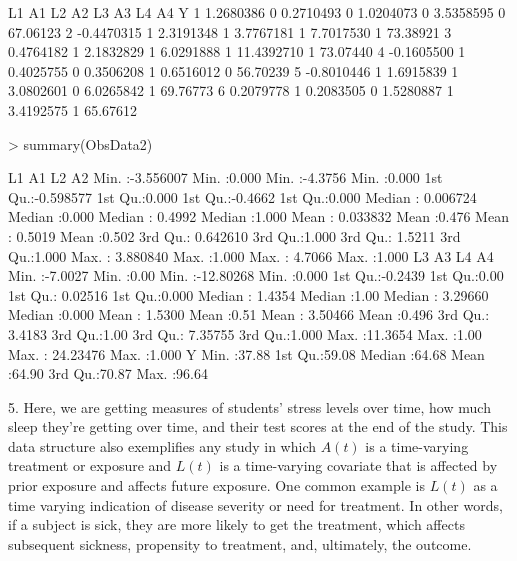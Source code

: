 \documentclass[answers]{exam}
\begin{document}
\begin{solution}
\begin{Schunk}
\begin{Soutput}
          L1 A1        L2 A2        L3 A3         L4 A4        Y
1  1.2680386  0 0.2710493  0 1.0204073  0  3.5358595  0 67.06123
2 -0.4470315  1 2.3191348  1 3.7767181  1  7.7017530  1 73.38921
3  0.4764182  1 2.1832829  1 6.0291888  1 11.4392710  1 73.07440
4 -0.1605500  1 0.4025755  0 0.3506208  1  0.6516012  0 56.70239
5 -0.8010446  1 1.6915839  1 3.0802601  0  6.0265842  1 69.76773
6  0.2079778  1 0.2083505  0 1.5280887  1  3.4192575  1 65.67612
\end{Soutput}
\begin{Sinput}
> summary(ObsData2)
\end{Sinput}
\begin{Soutput}
       L1                  A1              L2                A2       
 Min.   :-3.556007   Min.   :0.000   Min.   :-4.3756   Min.   :0.000  
 1st Qu.:-0.598577   1st Qu.:0.000   1st Qu.:-0.4662   1st Qu.:0.000  
 Median : 0.006724   Median :0.000   Median : 0.4992   Median :1.000  
 Mean   : 0.033832   Mean   :0.476   Mean   : 0.5019   Mean   :0.502  
 3rd Qu.: 0.642610   3rd Qu.:1.000   3rd Qu.: 1.5211   3rd Qu.:1.000  
 Max.   : 3.880840   Max.   :1.000   Max.   : 4.7066   Max.   :1.000  
       L3                A3             L4                  A4       
 Min.   :-7.0027   Min.   :0.00   Min.   :-12.80268   Min.   :0.000  
 1st Qu.:-0.2439   1st Qu.:0.00   1st Qu.:  0.02516   1st Qu.:0.000  
 Median : 1.4354   Median :1.00   Median :  3.29660   Median :0.000  
 Mean   : 1.5300   Mean   :0.51   Mean   :  3.50466   Mean   :0.496  
 3rd Qu.: 3.4183   3rd Qu.:1.00   3rd Qu.:  7.35755   3rd Qu.:1.000  
 Max.   :11.3654   Max.   :1.00   Max.   : 24.23476   Max.   :1.000  
       Y        
 Min.   :37.88  
 1st Qu.:59.08  
 Median :64.68  
 Mean   :64.90  
 3rd Qu.:70.87  
 Max.   :96.64  
\end{Soutput}
\end{Schunk}

5. Here, we are getting measures of students' stress levels over time, how much sleep they're getting over time, and their test scores at the end of the study. This data structure also exemplifies any study in which $A(t)$ is a time-varying treatment or exposure and $L(t)$ is a time-varying covariate that is affected by prior exposure and affects future exposure. One common example is $L(t)$ as a time varying indication of disease severity or need for treatment. In other words, if a subject is sick, they are more likely to get the treatment, which affects subsequent sickness, propensity to treatment, and, ultimately, the outcome.


\end{solution}
\end{document}
